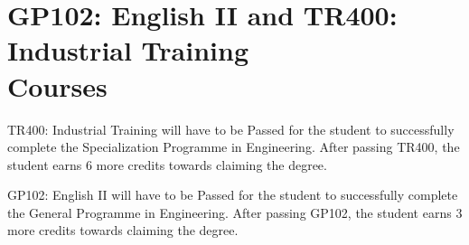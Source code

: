 \documentclass[12pt]{article}
\begin{document}




\section[GP102: English II and TR400: Industrial Training Courses]{\texorpdfstring{GP102: English II and TR400: Industrial Training \\Courses}{GP102: English II and TR400: Industrial Training Courses}}

TR400: Industrial Training will have to be Passed for the student to successfully complete the Specialization Programme in Engineering. After passing TR400, the student earns 6 more credits towards claiming the degree.

\noindent GP102: English II will have to be Passed for the student to successfully complete the General Programme in Engineering. After passing GP102, the student earns 3 more credits towards claiming the degree.
\end{document}
